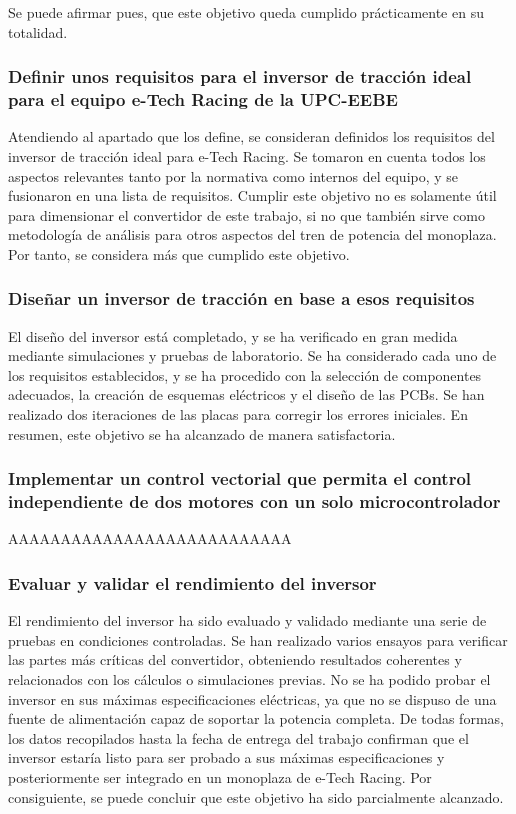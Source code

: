 Se puede afirmar pues, que este objetivo queda cumplido prácticamente en su totalidad.

\subsubsection{Definir unos requisitos para el inversor de tracción ideal para el equipo e-Tech Racing de la UPC-EEBE}

Atendiendo al apartado que los define, se consideran definidos los requisitos del inversor de tracción ideal para e-Tech Racing. Se tomaron en cuenta todos los aspectos relevantes tanto por la normativa como internos del equipo, y se fusionaron en una lista de requisitos. Cumplir este objetivo no es solamente útil para dimensionar el convertidor de este trabajo, si no que también sirve como metodología de análisis para otros aspectos del tren de potencia del monoplaza. Por tanto, se considera más que cumplido este objetivo.

\subsubsection{Diseñar un inversor de tracción en base a esos requisitos}

El diseño del inversor está completado, y se ha verificado en gran medida mediante simulaciones y pruebas de laboratorio. Se ha considerado cada uno de los requisitos establecidos, y se ha procedido con la selección de componentes adecuados, la creación de esquemas eléctricos y el diseño de las PCBs. Se han realizado dos iteraciones de las placas para corregir los errores iniciales. En resumen, este objetivo se ha alcanzado de manera satisfactoria.

\subsubsection{Implementar un control vectorial que permita el control independiente de dos motores con un solo microcontrolador}

AAAAAAAAAAAAAAAAAAAAAAAAAAA


\subsubsection{Evaluar y validar el rendimiento del inversor}

El rendimiento del inversor ha sido evaluado y validado mediante una serie de pruebas en condiciones controladas. Se han realizado varios ensayos para verificar las partes más críticas del convertidor, obteniendo resultados coherentes y relacionados con los cálculos o simulaciones previas. No se ha podido probar el inversor en sus máximas especificaciones eléctricas, ya que no se dispuso de una fuente de alimentación capaz de soportar la potencia completa. De todas formas, los datos recopilados hasta la fecha de entrega del trabajo confirman que el inversor estaría listo para ser probado a sus máximas especificaciones y posteriormente ser integrado en un monoplaza de e-Tech Racing. Por consiguiente, se puede concluir que este objetivo ha sido parcialmente alcanzado.

